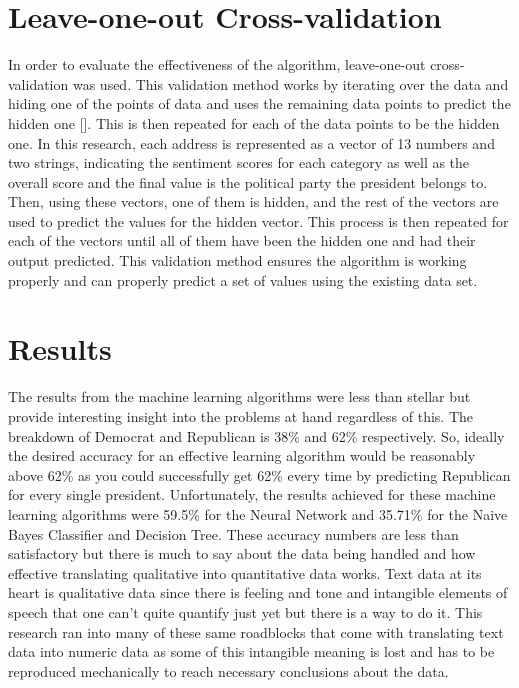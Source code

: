 \section{Leave-one-out Cross-validation}
In order to evaluate the effectiveness of the algorithm, leave-one-out cross-validation was used.
This validation method works by iterating over the data and hiding one of the points of data and uses the remaining data points to predict the hidden one [\cite{tzutsung2015validation}].
This is then repeated for each of the data points to be the hidden one.
In this research, each address is represented as a vector of 13 numbers and two strings, indicating the sentiment scores for each category as well as the overall score and the final value is the political party the president belongs to.
Then, using these vectors, one of them is hidden, and the rest of the vectors are used to predict the values for the hidden vector.
This process is then repeated for each of the vectors until all of them have been the hidden one and had their output predicted.
This validation method ensures the algorithm is working properly and can properly predict a set of values using the existing data set.

\section{Results}
The results from the machine learning algorithms were less than stellar but provide interesting insight into the problems at hand regardless of this.
The breakdown of Democrat and Republican is 38\% and 62\% respectively.
So, ideally the desired accuracy for an effective learning algorithm would be reasonably above 62\% as you could successfully get 62\% every time by predicting Republican for every single president.
Unfortunately, the results achieved for these machine learning algorithms were 59.5\% for the Neural Network and 35.71\% for the Naive Bayes Classifier and Decision Tree.
These accuracy numbers are less than satisfactory but there is much to say about the data being handled and how effective translating qualitative into quantitative data works.
Text data at its heart is qualitative data since there is feeling and tone and intangible elements of speech that one can't quite quantify just yet but there is a way to do it.
This research ran into many of these same roadblocks that come with translating text data into numeric data as some of this intangible meaning is lost and has to be reproduced mechanically to reach necessary conclusions about the data.

